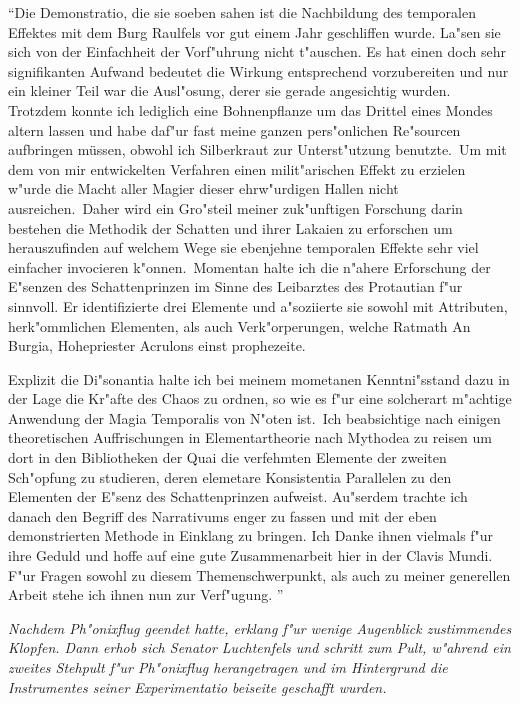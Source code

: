 \documentclass[a5paper,8pt]{book}
\begin{document}
``Die Demonstratio, die sie soeben sahen ist die Nachbildung des temporalen Effektes mit dem Burg Raulfels vor gut einem Jahr geschliffen wurde. La"sen sie sich von der 
Einfachheit der Vorf"uhrung nicht t"auschen. Es hat einen doch sehr signifikanten Aufwand bedeutet die Wirkung entsprechend vorzubereiten und nur ein kleiner Teil war die 
Ausl"osung, derer sie gerade angesichtig wurden. Trotzdem konnte ich lediglich eine Bohnenpflanze um das Drittel eines Mondes altern lassen und habe daf"ur fast meine ganzen 
pers"onlichen Re"sourcen aufbringen müssen, obwohl ich Silberkraut zur Unterst"utzung benutzte.\
Um mit dem von mir entwickelten Verfahren einen milit"arischen Effekt zu erzielen w"urde die Macht aller Magier dieser ehrw"urdigen Hallen nicht ausreichen.\
Daher wird ein Gro"steil meiner zuk"unftigen Forschung darin bestehen die Methodik der Schatten und ihrer Lakaien zu erforschen um herauszufinden auf welchem Wege sie ebenjehne 
temporalen Effekte sehr viel einfacher invocieren k"onnen.\
Momentan halte ich die n"ahere Erforschung der E"senzen des Schattenprinzen im Sinne des Leibarztes des Protautian f"ur sinnvoll. Er identifizierte drei Elemente und 
a"soziierte sie sowohl mit Attributen, herk"ommlichen Elementen, als auch Verk"orperungen, welche Ratmath An Burgia, Hohepriester Acrulons einst prophezeite.\

Explizit die Di"sonantia halte ich bei meinem mometanen Kenntni"sstand dazu in der Lage die Kr"afte des Chaos zu ordnen, so wie es f"ur eine solcherart m"achtige Anwendung 
der Magia Temporalis von N"oten ist.\
Ich beabsichtige nach einigen theoretischen Auffrischungen in Elementartheorie nach Mythodea zu reisen um dort in den Bibliotheken der Quai die verfehmten Elemente der 
zweiten Sch"opfung zu studieren, deren elemetare Konsistentia Parallelen zu den Elementen der E"senz des Schattenprinzen aufweist.
Au"serdem trachte ich danach den Begriff des Narrativums enger zu fassen und mit der eben demonstrierten Methode in Einklang zu bringen.
Ich Danke ihnen vielmals f"ur ihre Geduld und hoffe auf eine gute Zusammenarbeit hier in der Clavis Mundi.
F"ur Fragen sowohl zu diesem Themenschwerpunkt, als auch zu meiner generellen Arbeit stehe ich ihnen nun zur Verf"ugung. ''

\textit{Nachdem Ph"onixflug geendet hatte, erklang f"ur wenige Augenblick zustimmendes Klopfen. Dann erhob sich Senator Luchtenfels und schritt zum Pult, w"ahrend ein zweites 
Stehpult f"ur Ph"onixflug herangetragen und im Hintergrund die Instrumentes seiner Experimentatio beiseite geschafft wurden.}
\end{document}
